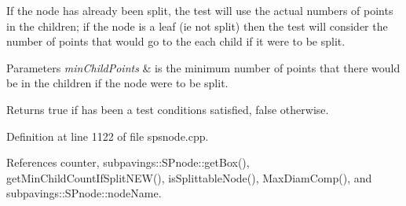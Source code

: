 \-If the node has already been split, the test will use the actual numbers of points in the children; if the node is a leaf (ie not split) then the test will consider the number of points that would go to the each child if it were to be split.


\begin{DoxyParams}{\-Parameters}
{\em min\-Child\-Points} & is the minimum number of points that there would be in the children if the node were to be split. \\
\hline
\end{DoxyParams}
\begin{DoxyReturn}{\-Returns}
true if has been a test conditions satisfied, false otherwise. 
\end{DoxyReturn}


\-Definition at line 1122 of file spsnode.\-cpp.



\-References counter, subpavings\-::\-S\-Pnode\-::get\-Box(), get\-Min\-Child\-Count\-If\-Split\-N\-E\-W(), is\-Splittable\-Node(), \-Max\-Diam\-Comp(), and subpavings\-::\-S\-Pnode\-::node\-Name.


